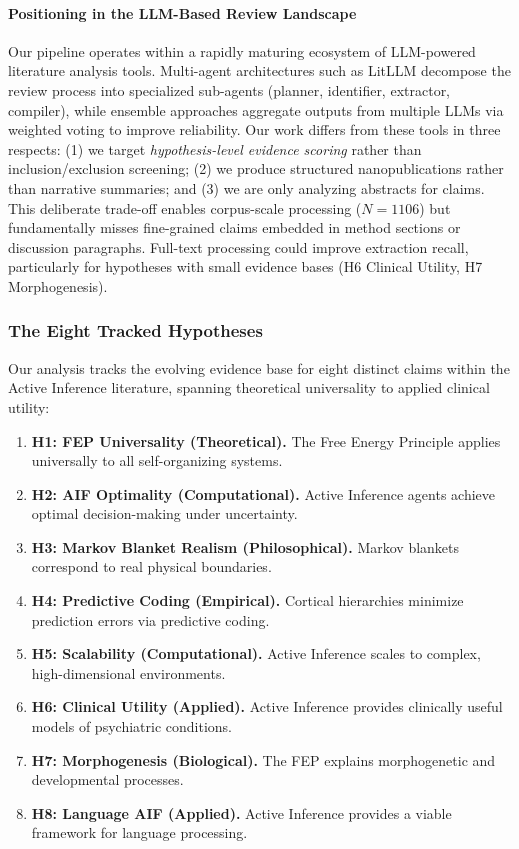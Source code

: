 \documentclass[
  english,
]{article}
\providecommand{\tightlist}{%
  \setlength{\itemsep}{0pt}\setlength{\parskip}{0pt}}
\begin{document}
\paragraph{Positioning in the LLM-Based Review
Landscape}\label{positioning-in-the-llm-based-review-landscape}

Our pipeline operates within a rapidly maturing ecosystem of LLM-powered
literature analysis tools. Multi-agent architectures such as LitLLM
decompose the review process into specialized sub-agents (planner,
identifier, extractor, compiler), while ensemble approaches aggregate
outputs from multiple LLMs via weighted voting to improve reliability.
Our work differs from these tools in three respects: (1) we target
\emph{hypothesis-level evidence scoring} rather than inclusion/exclusion
screening; (2) we produce structured nanopublications rather than
narrative summaries; and (3) we are only analyzing abstracts for claims.
This deliberate trade-off enables corpus-scale processing (\(N = 1106\))
but fundamentally misses fine-grained claims embedded in method sections
or discussion paragraphs. Full-text processing could improve extraction
recall, particularly for hypotheses with small evidence bases (H6
Clinical Utility, H7 Morphogenesis).

\subsubsection{The Eight Tracked
Hypotheses}\label{the-eight-tracked-hypotheses}

Our analysis tracks the evolving evidence base for eight distinct claims
within the Active Inference literature, spanning theoretical
universality to applied clinical utility:

\begin{enumerate}
\def\labelenumi{\arabic{enumi}.}
\tightlist
\item
  \textbf{H1: FEP Universality (Theoretical).} The Free Energy Principle
  applies universally to all self-organizing systems.
\item
  \textbf{H2: AIF Optimality (Computational).} Active Inference agents
  achieve optimal decision-making under uncertainty.
\item
  \textbf{H3: Markov Blanket Realism (Philosophical).} Markov blankets
  correspond to real physical boundaries.
\item
  \textbf{H4: Predictive Coding (Empirical).} Cortical hierarchies
  minimize prediction errors via predictive coding.
\item
  \textbf{H5: Scalability (Computational).} Active Inference scales to
  complex, high-dimensional environments.
\item
  \textbf{H6: Clinical Utility (Applied).} Active Inference provides
  clinically useful models of psychiatric conditions.
\item
  \textbf{H7: Morphogenesis (Biological).} The FEP explains
  morphogenetic and developmental processes.
\item
  \textbf{H8: Language AIF (Applied).} Active Inference provides a
  viable framework for language processing.
\end{enumerate}
\end{document}
